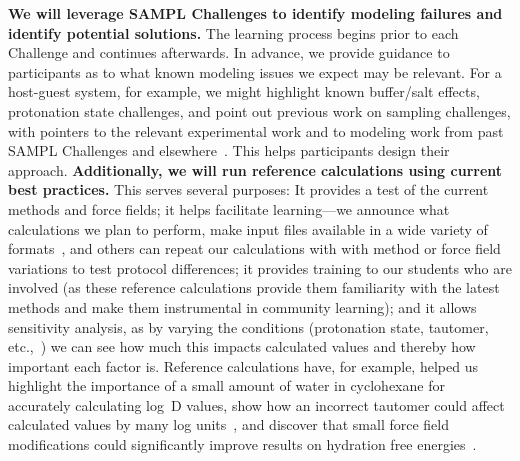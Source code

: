 \documentclass[11pt]{article}
\begin{document}
\textbf{We will leverage SAMPL Challenges to identify modeling failures and identify potential solutions.} 
The learning process begins prior to each Challenge and continues afterwards. 
In advance,  we provide guidance to participants as to what known modeling issues we expect may be relevant.
For a host-guest system, for example, we might highlight known buffer/salt effects, protonation state challenges, and point out previous work on sampling challenges, with pointers to the relevant experimental work and to modeling work from past SAMPL Challenges and elsewhere~\cite{Mobley:2017:AnnualReviewofBiophysics}.
This helps participants design their approach.
{\bf Additionally, we will run reference calculations using current best practices.} 
This serves several purposes:
It provides a test of the current methods and force fields; it helps facilitate learning---we announce what calculations we plan to perform, make input files available in a wide variety of formats~\cite{shirts_lessons_2016, yin_overview_2016, Bannan:2016:JComputAidedMolDes}, and others can repeat our calculations with with method or force field variations to test protocol differences; it provides training to our students who are involved (as these reference calculations provide them familiarity with the latest methods and make them instrumental in community learning);  and it allows sensitivity analysis, as by varying the conditions (protonation state, tautomer, etc.,~\cite{Bannan:2016:JComputAidedMolDes}) we can see how much this impacts calculated values and thereby how important each factor is.
Reference calculations have, for example, helped us highlight the importance of a small amount of water in cyclohexane for accurately calculating log~D values, show how an incorrect tautomer could affect calculated values by many log units~\cite{Bannan:2016:JComputAidedMolDes}, and discover that small force field modifications could significantly improve results on hydration free energies~\cite{mobley_blind_2014-1}.
\end{document}
